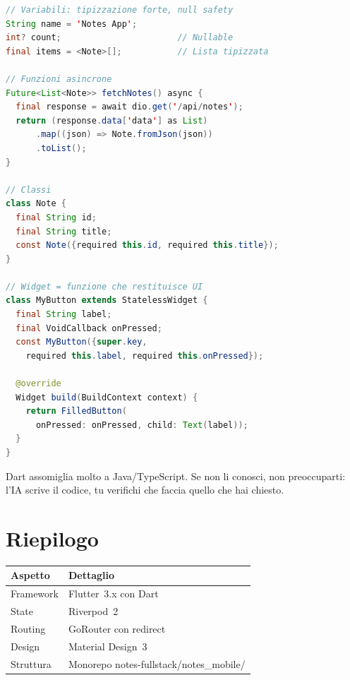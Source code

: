\begin{lstlisting}[language=Java,title={Concetti chiave Dart}]
// Variabili: tipizzazione forte, null safety
String name = 'Notes App';
int? count;                       // Nullable
final items = <Note>[];           // Lista tipizzata

// Funzioni asincrone
Future<List<Note>> fetchNotes() async {
  final response = await dio.get('/api/notes');
  return (response.data['data'] as List)
      .map((json) => Note.fromJson(json))
      .toList();
}

// Classi
class Note {
  final String id;
  final String title;
  const Note({required this.id, required this.title});
}

// Widget = funzione che restituisce UI
class MyButton extends StatelessWidget {
  final String label;
  final VoidCallback onPressed;
  const MyButton({super.key,
    required this.label, required this.onPressed});

  @override
  Widget build(BuildContext context) {
    return FilledButton(
      onPressed: onPressed, child: Text(label));
  }
}
\end{lstlisting}

\begin{tipbox}
Dart assomiglia molto a Java/TypeScript. Se non li conosci, non preoccuparti: l'IA scrive il codice, tu verifichi che faccia quello che hai chiesto.
\end{tipbox}

\section*{Riepilogo}

\begin{center}
\begin{tabularx}{\textwidth}{l X}
\toprule
\textbf{Aspetto} & \textbf{Dettaglio} \\
\midrule
Framework & Flutter~3.x con Dart \\
State & Riverpod~2 \\
Routing & GoRouter con redirect \\
Design & Material Design~3 \\
Struttura & Monorepo notes-fullstack/notes\_mobile/ \\
\bottomrule
\end{tabularx}
\end{center}
